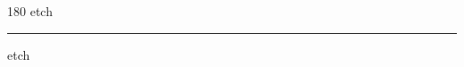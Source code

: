 
\begin{frame}
\begin{center}
\begin{turn}{180}
{\fontsize{2.5cm}{1em}\selectfont etch}
\end{turn}
\vspace{1em}\par  
\hrule
\vspace{1em}\par  
{\fontsize{2.5cm}{1em}\selectfont etch}
\end{center}
\end{frame}
